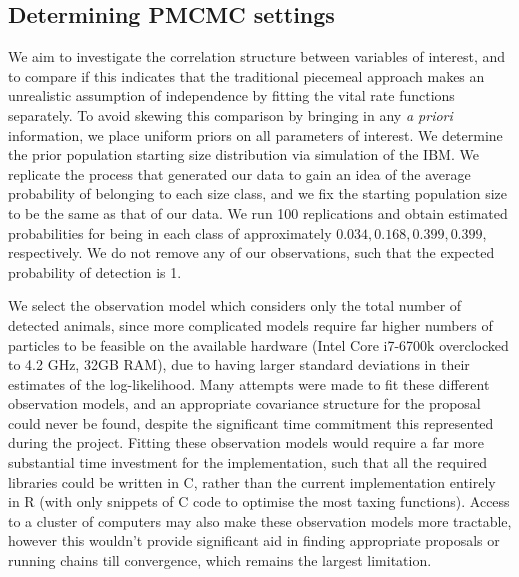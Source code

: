\documentclass[a4paper,12pt]{article}
\begin{document}
\subsection{Determining PMCMC settings}
We aim to investigate the correlation structure between variables of interest, and to compare if this indicates that the traditional piecemeal approach makes an unrealistic assumption of independence by fitting the vital rate functions separately. To avoid skewing this comparison by bringing in any \textit{a priori} information, we place uniform priors on all parameters of interest. We determine the prior population starting size distribution via simulation of the IBM. We replicate the process that generated our data to gain an idea of the average probability of belonging to each size class, and we fix the starting population size to be the same as that of our data. We run 100 replications and obtain estimated probabilities for being in each class of approximately $0.034, 0.168, 0.399, 0.399$, respectively. We do not remove any of our observations, such that the expected probability of detection is 1.

We select the observation model which considers only the total number of detected animals, since more complicated models require far higher numbers of particles to be feasible on the available hardware (Intel Core i7-6700k overclocked to 4.2 GHz, 32GB RAM), due to having larger standard deviations in their estimates of the log-likelihood. Many attempts were made to fit these different observation models, and an appropriate covariance structure for the proposal could never be found, despite the significant time commitment this represented during the project. Fitting these observation models would require a far more substantial time investment for the implementation, such that all the required libraries could be written in C, rather than the current implementation entirely in R (with only snippets of C code to optimise the most taxing functions). Access to a cluster of computers may also make these observation models more tractable, however this wouldn't provide significant aid in finding appropriate proposals or running chains till convergence, which remains the largest limitation.
\end{document}
